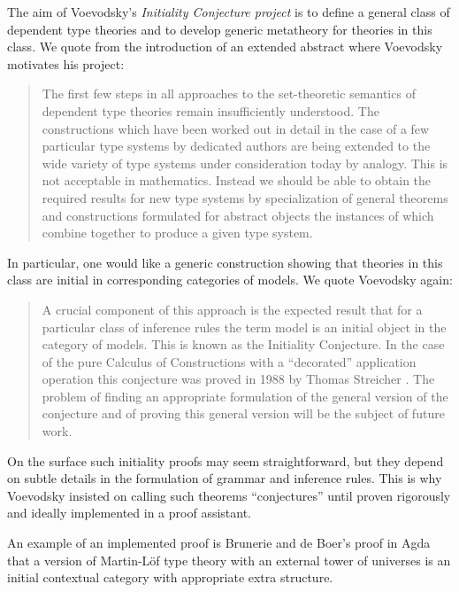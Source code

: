 \documentclass[11pt,a4paper]{article}
\theoremstyle{plain}
\theoremstyle{definition}
\begin{document}
The aim of Voevodsky's  {\em Initiality Conjecture project} is to define a general class of dependent type theories and to develop generic metatheory for theories in this class. We quote from the introduction of an extended abstract where Voevodsky \cite{voevodsky:initiality} motivates his project:
\begin{quotation}
The first few steps in all approaches to the set-theoretic semantics of dependent
type theories remain insuﬃciently understood. The constructions which have been
worked out in detail in the case of a few particular type systems by dedicated authors
are being extended to the wide variety of type systems under consideration today by
analogy. This is not acceptable in mathematics. Instead we should be able to obtain
the required results for new type systems by specialization of general theorems and
constructions formulated for abstract objects the instances of which combine together
to produce a given type system.
\end{quotation}
In particular, one would like a generic construction showing that theories in this class are initial in corresponding categories of models. We quote Voevodsky \cite{voevodsky:initiality} again:
\begin{quotation}
A crucial component of this approach is the expected result that for a particular
class of inference rules the term model is an initial object in the category of models.
This is known as the Initiality Conjecture. In the case of the pure Calculus of
Constructions with a “decorated” application operation this conjecture was proved in
1988 by Thomas Streicher \cite{streicher:thesis}. The problem of finding an appropriate formulation
of the general version of the conjecture and of proving this general version will be the
subject of future work.
\end{quotation}
On the surface such initiality proofs may seem straightforward, but they depend on subtle details in the formulation of grammar and inference rules. This is why Voevodsky insisted on calling such theorems ``conjectures'' until proven rigorously and ideally implemented in a proof assistant.

An example of an implemented proof is Brunerie and de Boer's \cite{Brunerie:initiality,deBoer:lic} proof in Agda that a version of Martin-Löf type theory with an external tower of universes is an initial contextual category \cite{cartmell:phd,cartmell:apal} with appropriate extra structure. %
\end{document}
